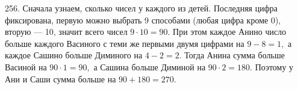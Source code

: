 256. Сначала узнаем, сколько чисел у каждого из детей. Последняя цифра фиксирована, первую можно выбрать 9 способами (любая цифра кроме 0), вторую --- 10, значит всего чисел $9\cdot10=90.$ При этом каждое Анино число больше каждого Васиного с теми же первыми двумя цифрами на $9-8=1,$ а каждое Сашино больше Диминого на $4-2=2.$ Тогда Анина сумма больше Васиной на $90\cdot1=90,$ а Сашина больше Диминой на $90\cdot2=180.$ Поэтому у Ани и Саши сумма больше на $90+180=270.$\\
